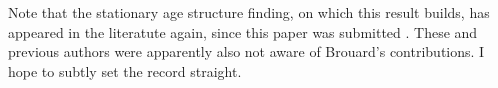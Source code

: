 \documentclass{article}
\begin{document}
Note that the stationary age structure finding, on which this result builds, has
appeared in the literatute again, since this paper was submitted
\citep{rao2014generalization}. These and previous authors were apparently also
not aware of Brouard's contributions. I hope to subtly set the record straight.


   
\end{document}
